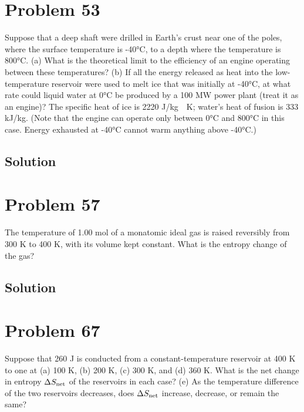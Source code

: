 \documentclass[12pt]{article}
\begin{document}
    \pagebreak
    \section{Problem 53}
        Suppose that a deep shaft were drilled in Earth's crust near one of the poles, where the surface temperature is -40\unit{\celsius}, to a depth where the temperature is 800°C. 
        (a) What is the theoretical limit to the efficiency of an engine operating between these temperatures?
        (b) If all the energy released as heat into the low-temperature reservoir were used to melt ice that was initially at -40\unit{\celsius}, at what rate could liquid water at 0\unit{\celsius} be produced by a 100 MW power plant (treat it as an engine)? 
        The specific heat of ice is 2220 \unit{\joule/\kilo\gram\cdot\kelvin}; water's heat of fusion is 333 \unit{\kilo\joule/\kilo\gram}. 
        (Note that the engine can operate only between 0\unit{\celsius} and 800\unit{\celsius} in this case. 
        Energy exhausted at -40\unit{\celsius} cannot warm anything above -40\unit{\celsius}.)

        \subsection{Solution}

    \section{Problem 57}
        The temperature of 1.00 mol of a monatomic ideal gas is raised reversibly from 300 K to 400 K, with its volume kept constant. 
        What is the entropy change of the gas?

        \subsection{Solution}

    \section{Problem 67}
        Suppose that 260 J is conducted from a constant-temperature reservoir at 400 K to one at (a) 100 K, (b) 200 K, (c) 300 K, and (d) 360 K. 
        What is the net change in entropy $\Delta S_{\rm net}$ of the reservoirs in each case? 
        (e) As the temperature difference of the two reservoirs decreases, does $\Delta S_{\rm net}$ increase, decrease, or remain the same?
\end{document}

